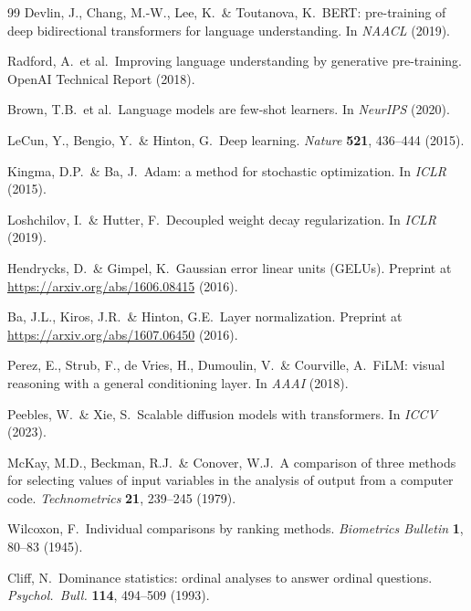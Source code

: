 \documentclass[11pt,a4paper]{article}
\begin{document}
\begin{thebibliography}{99}
 Devlin, J., Chang, M.-W., Lee, K.\ \& Toutanova, K.\
BERT: pre-training of deep bidirectional transformers for language
understanding. In \emph{NAACL} (2019).

 Radford, A.\ et al.\ Improving language understanding
by generative pre-training. OpenAI Technical Report (2018).

 Brown, T.B.\ et al.\ Language models are few-shot
learners. In \emph{NeurIPS} (2020).

 LeCun, Y., Bengio, Y.\ \& Hinton, G.\ Deep learning.
\emph{Nature} \textbf{521}, 436--444 (2015).

 Kingma, D.P.\ \& Ba, J.\ Adam: a method for
stochastic optimization. In \emph{ICLR} (2015).

 Loshchilov, I.\ \& Hutter, F.\ Decoupled weight
decay regularization. In \emph{ICLR} (2019).

 Hendrycks, D.\ \& Gimpel, K.\ Gaussian error
linear units (GELUs). Preprint at \url{https://arxiv.org/abs/1606.08415}
(2016).

 Ba, J.L., Kiros, J.R.\ \& Hinton, G.E.\ Layer
normalization. Preprint at \url{https://arxiv.org/abs/1607.06450} (2016).

 Perez, E., Strub, F., de Vries, H., Dumoulin, V.\ \&
Courville, A.\ FiLM: visual reasoning with a general conditioning layer. In
\emph{AAAI} (2018).

 Peebles, W.\ \& Xie, S.\ Scalable diffusion models
with transformers. In \emph{ICCV} (2023).

 McKay, M.D., Beckman, R.J.\ \& Conover, W.J.\ A
comparison of three methods for selecting values of input variables in the
analysis of output from a computer code. \emph{Technometrics} \textbf{21},
239--245 (1979).

 Wilcoxon, F.\ Individual comparisons by ranking
methods. \emph{Biometrics Bulletin} \textbf{1}, 80--83 (1945).

 Cliff, N.\ Dominance statistics: ordinal
analyses to answer ordinal questions. \emph{Psychol.\ Bull.} \textbf{114},
494--509 (1993).

\end{thebibliography}
\end{document}
